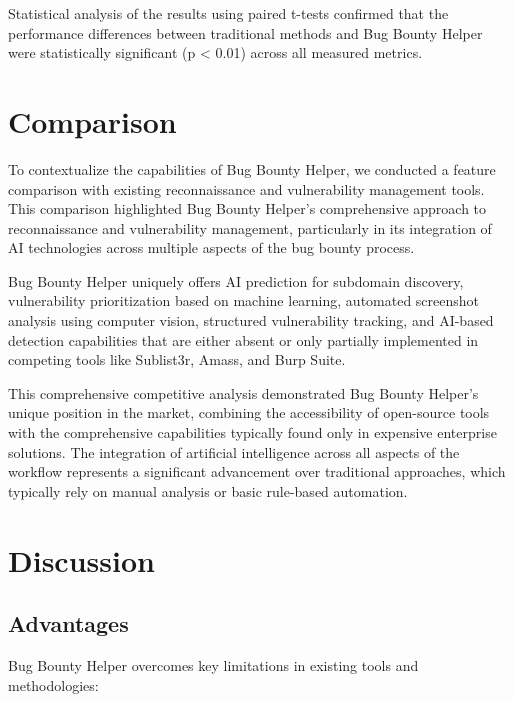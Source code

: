\documentclass[conference]{IEEEtran}
\begin{document}
Statistical analysis of the results using paired t-tests confirmed that the performance differences between traditional methods and Bug Bounty Helper were statistically significant (p < 0.01) across all measured metrics.

\section{Comparison}
To contextualize the capabilities of Bug Bounty Helper, we conducted a feature comparison with existing reconnaissance and vulnerability management tools. This comparison highlighted Bug Bounty Helper's comprehensive approach to reconnaissance and vulnerability management, particularly in its integration of AI technologies across multiple aspects of the bug bounty process.

Bug Bounty Helper uniquely offers AI prediction for subdomain discovery, vulnerability prioritization based on machine learning, automated screenshot analysis using computer vision, structured vulnerability tracking, and AI-based detection capabilities that are either absent or only partially implemented in competing tools like Sublist3r, Amass, and Burp Suite.

This comprehensive competitive analysis demonstrated Bug Bounty Helper's unique position in the market, combining the accessibility of open-source tools with the comprehensive capabilities typically found only in expensive enterprise solutions. The integration of artificial intelligence across all aspects of the workflow represents a significant advancement over traditional approaches, which typically rely on manual analysis or basic rule-based automation.

\section{Discussion}
\subsection{Advantages}
Bug Bounty Helper overcomes key limitations in existing tools and methodologies:
\end{document}

